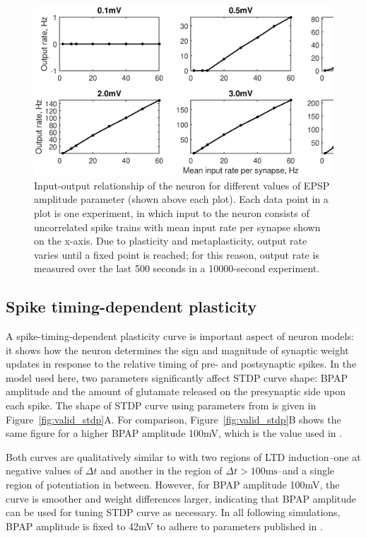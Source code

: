 \documentclass[a4paper,12pt]{report}
\theoremstyle{definition}
\begin{document}
\begin{figure}[h]
    \includegraphics[width=\textwidth]{figures/valid_iocurve_vs_epsp_grid.eps}
    \caption{Input-output relationship of the neuron for different values of EPSP amplitude parameter (shown above each plot). Each data point in a plot is one experiment, in which input to the neuron consists of uncorrelated spike trains with mean input rate per synapse shown on the x-axis. Due to plasticity and metaplasticity, output rate varies until a fixed point is reached; for this reason, output rate is measured over the last 500 seconds in a 10000-second experiment.}
    \label{fig:valid_iocurve_vs_epsp_grid}
\end{figure}




\subsection{Spike timing-dependent plasticity}

A spike-timing-dependent plasticity curve is important aspect of neuron models: it shows how the neuron determines the sign and magnitude of  synaptic weight updates in response to the relative timing of pre- and postsynaptic spikes. In the model used here, two parameters significantly affect STDP curve shape: BPAP amplitude and the amount of glutamate released on the presynaptic side upon each spike. The shape of STDP curve using parameters from \cite{yeung2004synaptic} is given in Figure~\ref{fig:valid_stdp}A. For comparison, Figure~\ref{fig:valid_stdp}B shows the same figure for a higher BPAP amplitude 100mV, which is the value used in \cite{shouval2002unified}.

Both curves are qualitatively similar to \cite{shouval2002unified} with two regions of LTD induction--one at negative values of $\Delta t$ and another in the region of $\Delta t > 100\mathrm{ms}$--and a single region of potentiation in between. However, for BPAP amplitude 100mV, the curve is smoother and weight differences larger, indicating that BPAP amplitude can be used for tuning STDP curve as necessary. In all following simulations, BPAP amplitude is fixed to 42mV to adhere to parameters published in \cite{yeung2004synaptic}.
\end{document}
